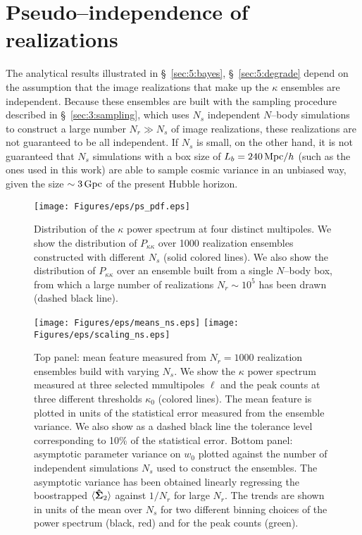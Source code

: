 \section{Pseudo--independence of realizations}
\label{sec:5:pseudo}
The analytical results illustrated in \S~\ref{sec:5:bayes}, \S~\ref{sec:5:degrade} depend on the assumption that the image realizations that make up the $\kappa$ ensembles are independent. Because these ensembles are built with the sampling procedure described in \S~\ref{sec:3:sampling}, which uses $N_s$ independent $N$--body simulations to construct a large number $N_r\gg N_s$ of image realizations, these realizations are not guaranteed to be all independent. If $N_s$ is small, on the other hand, it is not guaranteed that $N_s$ simulations with a box size of $L_b=240\,{\rm Mpc}/h$ (such as the ones used in this work) are able to sample cosmic variance in an unbiased way, given the size $\sim 3\,{\rm Gpc}$ of the present Hubble horizon. 
%
\begin{figure}
\begin{center}
\texttt{[image: Figures/eps/ps\_pdf.eps]}
\end{center}
\caption{Distribution of the $\kappa$ power spectrum at four distinct multipoles. We show the distribution of $P_{\kappa\kappa}$ over 1000 realization ensembles constructed with different $N_s$ (solid colored lines). We also show the distribution of $P_{\kappa\kappa}$ over an ensemble built from a single $N$--body box, from which a large number of realizations $N_r\sim 10^5$ has been drawn (dashed black line).}
\label{fig:5:pspdf}
\end{figure}
%
\begin{figure}
\begin{center}
\texttt{[image: Figures/eps/means\_ns.eps]} \texttt{[image: Figures/eps/scaling\_ns.eps]}
\end{center}
\caption{Top panel: mean feature measured from $N_r=1000$ realization ensembles build with varying $N_s$. We show the $\kappa$ power spectrum measured at three selected mmultipoles $\ell$ and the peak counts at three different thresholds $\kappa_0$ (colored lines). The mean feature is plotted in units of the statistical error measured from the ensemble variance. We also show as a dashed black line the tolerance level corresponding to 10\% of the statistical error. Bottom panel: asymptotic parameter variance on $w_0$ plotted against the number of independent simulations $N_s$ used to construct the ensembles. The asymptotic variance has been obtained linearly regressing the boostrapped $\langle\mathbf{\hat{\Sigma}}_2\rangle$ against $1/N_r$ for large $N_r$. The trends are shown in units of the mean over $N_s$ for two different binning choices of the power spectrum (black, red) and for the peak counts (green).}
\label{fig:5:mcns}
\end{figure}
